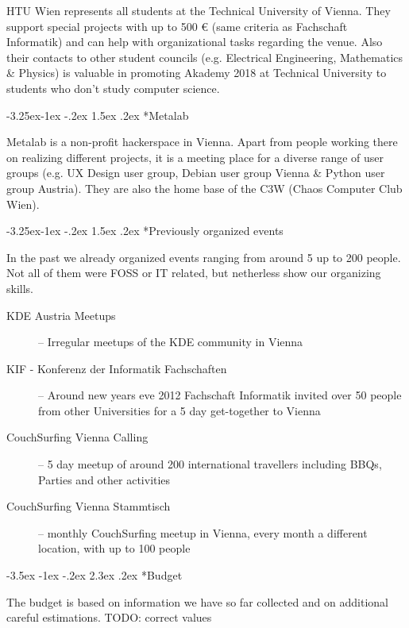 \documentclass[10pt,a4paper]{article}
\makeatletter
\renewcommand\section{%
\@startsection{section}{1}{\z@}%
              {-3.5ex \@plus -1ex \@minus -.2ex}%
              {2.3ex \@plus.2ex}%
              {\color{kdelight}\sffamily\LARGE\bfseries}}
\renewcommand\subsection{%
\@startsection{subsection}{2}{\z@}%
              {-3.25ex\@plus -1ex \@minus -.2ex}%
              {1.5ex \@plus .2ex}%
              {\color{kdelight}\sffamily\Large\bfseries}}
\renewcommand\subsubsection{%
\@startsection{subsubsection}{2}{\z@}%
              {-3.25ex\@plus -1ex \@minus -.2ex}%
              {1.5ex \@plus .2ex}%
              {\color{kdedarker}\sffamily\large\bfseries}}
\makeatother
\begin{document}
HTU Wien represents all students at the Technical University of Vienna. They support special projects with up to 500 \euro{} (same criteria as Fachschaft Informatik) and can help with organizational tasks regarding the venue. Also their contacts to other student councils (e.g. Electrical Engineering, Mathematics \& Physics) is valuable in promoting Akademy 2018 at Technical University to students who don't study computer science.

\subsubsection*{Metalab}

Metalab is a non-profit hackerspace in Vienna. Apart from people working there on realizing different projects, it is a meeting place for a diverse range of user groups (e.g. UX Design user group, Debian user group Vienna \& Python user group Austria). They are also the home base of the C3W (Chaos Computer Club Wien).


\subsection*{Previously organized events}
In the past we already organized events ranging from around 5 up to 200 people. Not all of them were FOSS or IT related, but netherless show our organizing skills.

\begin{description}
\item[\color{kdedarker} KDE Austria Meetups] -- Irregular meetups of the KDE community in Vienna
\item[\color{kdedarker} KIF - Konferenz der Informatik Fachschaften] -- Around new years eve 2012 Fachschaft Informatik invited over 50 people from other Universities for a 5 day get-together to Vienna
\item[\color{kdedarker} CouchSurfing Vienna Calling] -- 5 day meetup of around 200 international travellers including BBQs, Parties and other activities
\item[\color{kdedarker} CouchSurfing Vienna Stammtisch] -- monthly CouchSurfing meetup in Vienna, every month a different location, with up to 100 people
\end{description}

\cleardoublepage

\section*{Budget}
The budget is based on information we have so far collected and on additional careful estimations. TODO: correct values
\end{document}
